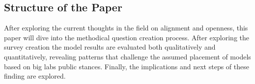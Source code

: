 \subsection{Structure of the Paper}

After exploring the current thoughts in the field on alignment and openness, this paper will dive into the methodical question creation process. After exploring the survey creation the model results are evaluated both qualitatively and quantitatively, revealing patterns that challenge the assumed placement of models based on big labs public stances. Finally, the implications and next steps of these finding are explored.


